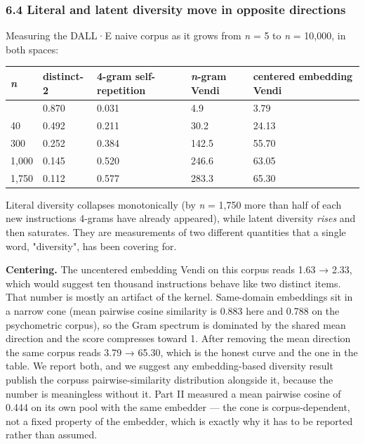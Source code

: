 \documentclass[
  11pt,
]{article}
\theoremstyle{plain}
\theoremstyle{definition}
\begin{document}
\subsubsection{6.4 Literal and latent diversity move in opposite
directions}\label{64-literal-and-latent-diversity-move-in-opposite-directions}

Measuring the DALL·E naive corpus as it grows from \emph{n} = 5 to
\emph{n} = 10,000, in both spaces:

\begin{longtable}[]{@{}lllll@{}}
\toprule\noalign{}
\emph{n} & distinct-2 & 4-gram self-repetition & \emph{n}-gram Vendi &
centered embedding Vendi \\
\midrule\noalign{}
\endhead
\bottomrule\noalign{}
\endlastfoot
5 & 0.870 & 0.031 & 4.9 & 3.79 \\
40 & 0.492 & 0.211 & 30.2 & 24.13 \\
300 & 0.252 & 0.384 & 142.5 & 55.70 \\
1,000 & 0.145 & 0.520 & 246.6 & 63.05 \\
1,750 & 0.112 & 0.577 & 283.3 & 65.30 \\
\end{longtable}

Literal diversity collapses monotonically (by \emph{n} = 1,750 more than
half of each new instruction\textquotesingle s 4-grams have already
appeared), while latent diversity \emph{rises} and then saturates. They
are measurements of two different quantities that a single word,
"diversity", has been covering for.

\textbf{Centering.} The uncentered embedding Vendi on this corpus reads
1.63 → 2.33, which would suggest ten thousand instructions behave like
two distinct items. That number is mostly an artifact of the kernel.
Same-domain embeddings sit in a narrow cone (mean pairwise cosine
similarity is 0.883 here and 0.788 on the psychometric corpus), so the
Gram spectrum is dominated by the shared mean direction and the score
compresses toward 1. After removing the mean direction the same corpus
reads 3.79 → 65.30, which is the honest curve and the one in the table.
We report both, and we suggest any embedding-based diversity result
publish the corpus\textquotesingle s pairwise-similarity distribution
alongside it, because the number is meaningless without it. Part II
measured a mean pairwise cosine of 0.444 on its own pool with the same
embedder --- the cone is corpus-dependent, not a fixed property of the
embedder, which is exactly why it has to be reported rather than
assumed.
\end{document}
